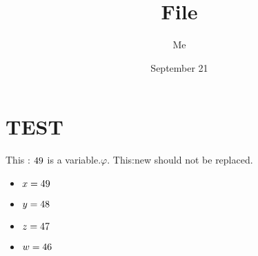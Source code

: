 \documentclass{article}
\title{File}
\author{Me}
\date{September 21}
\begin{document}
	\maketitle
\section{TEST}
This : $49$  is a variable.$\varphi$. This:new should not be replaced.
\begin{itemize}
    \item $ x = 49$ 
    \item $ y = 48$
    \item $ z = 47$
    \item $ w = 46$
\end{itemize}
\end{document}
